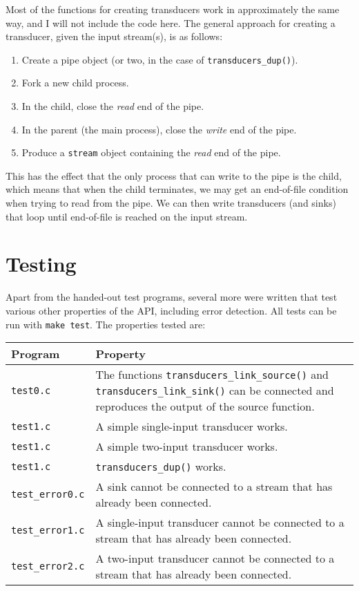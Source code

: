 \documentclass{article}
\begin{document}
Most of the functions for creating transducers work in approximately
the same way, and I will not include the code here.  The general
approach for creating a transducer, given the input stream(s), is as
follows:

\begin{enumerate}
\item Create a pipe object (or two, in the case of
  \texttt{transducers\_dup()}).
\item Fork a new child process.
\item In the child, close the \textit{read} end of the pipe.
\item In the parent (the main process), close the \textit{write} end
  of the pipe.
\item Produce a \texttt{stream} object containing the \textit{read}
  end of the pipe.
\end{enumerate}

This has the effect that the only process that can write to the pipe
is the child, which means that when the child terminates, we may get
an end-of-file condition when trying to read from the pipe.  We can
then write transducers (and sinks) that loop until end-of-file is
reached on the input stream.

\section{Testing}

Apart from the handed-out test programs, several more were written
that test various other properties of the API, including error
detection.  All tests can be run with \texttt{make test}.  The
properties tested are:

\begin{tabular}{lp{8cm}}
  \textbf{Program} & \textbf{Property} \\\hline

  \texttt{test0.c} & The functions \texttt{transducers\_link\_source()} and \texttt{transducers\_link\_sink()} can be connected and reproduces the output of the source function. \\

  \texttt{test1.c} & A simple single-input transducer works. \\

  \texttt{test1.c} & A simple two-input transducer works. \\

  \texttt{test1.c} & \texttt{transducers\_dup()} works. \\

  \texttt{test\_error0.c} & A sink cannot be connected to a stream that has already been connected. \\

  \texttt{test\_error1.c} & A single-input transducer cannot be connected to a stream that has already been connected. \\

  \texttt{test\_error2.c} & A two-input transducer cannot be connected to a stream that has already been connected. \\
\end{tabular}
\end{document}
